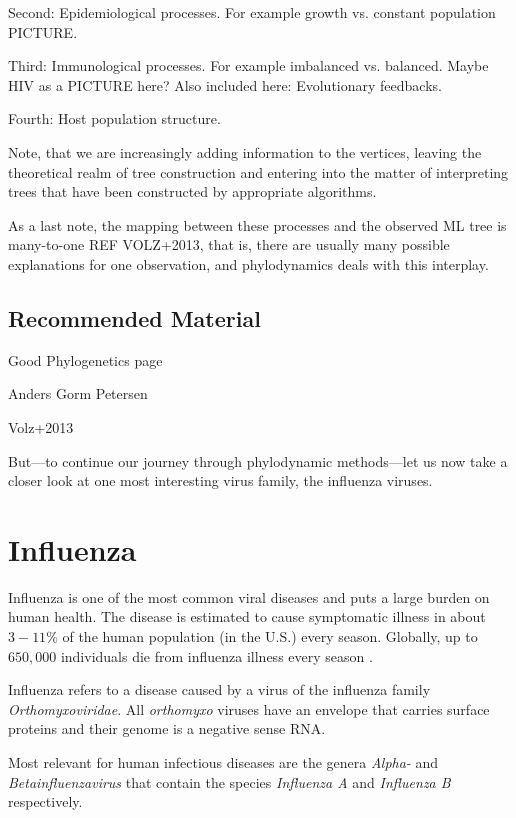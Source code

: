 \documentclass[12pt]{scrartcl}
\begin{document}
  Second: Epidemiological processes. For example growth vs. constant population PICTURE.

  Third: Immunological processes. For example imbalanced vs. balanced. Maybe HIV as a PICTURE here? Also included here: Evolutionary feedbacks.

  Fourth: Host population structure.

  Note, that we are increasingly adding information to the vertices, leaving the theoretical realm of tree construction and entering into the matter of interpreting trees that have been constructed by appropriate algorithms.

  As a last note, the mapping between these processes and the observed ML tree is many-to-one REF VOLZ+2013, that is, there are usually many possible explanations for one observation, and phylodynamics deals with this interplay.

  \subsection{Recommended Material}

  Good Phylogenetics page

  Anders Gorm Petersen

  Volz+2013

  But---to continue our journey through phylodynamic methods---let us now take a closer look at one most interesting virus family, the influenza viruses.


\section{Influenza}

  Influenza is one of the most common viral diseases \citep{DudaMenna20} and puts a large burden on human health. The disease is estimated to cause symptomatic illness in about $3 - 11 \%$ of the human population (in the U.S.) \citep{tokarsOlsen+18} every season. Globally, up to $650,000$ individuals die from influenza illness every season \cite[see][]{iulianoRoguski+18}.

  Influenza refers to a disease caused by a virus of the influenza family \textit{Orthomyxoviridae}. All \textit{orthomyxo} viruses have an envelope that carries surface proteins and their genome is a negative sense RNA.

  Most relevant for human infectious diseases are the genera \textit{Alpha-} and \textit{Betainfluenzavirus} that contain the species \textit{Influenza A} and \textit{Influenza B} respectively.
\end{document}
